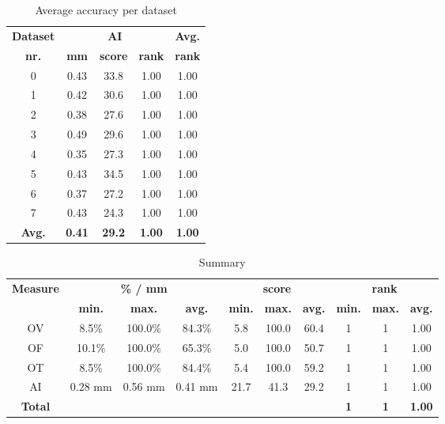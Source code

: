 \begin{table*}
\scriptsize
\caption{Average accuracy per dataset}
\centering
\begin{tabular}{|c|ccc|c|}
\hline
\multicolumn{1}{|c|}{\textbf{Dataset}} &\multicolumn{3}{c|}{\textbf{AI}} &\multicolumn{1}{c|}{\textbf{Avg.}} \\
\multicolumn{1}{|c|}{\textbf{nr.}} &\multicolumn{1}{c|}{\textbf{mm}} &\multicolumn{1}{c|}{\textbf{score}} &\multicolumn{1}{c|}{\textbf{rank}} &\multicolumn{1}{c|}{\textbf{rank}}\\
\hline
0&0.43&33.8& 1.00& 1.00\\
1&0.42&30.6& 1.00& 1.00\\
2&0.38&27.6& 1.00& 1.00\\
3&0.49&29.6& 1.00& 1.00\\
4&0.35&27.3& 1.00& 1.00\\
5&0.43&34.5& 1.00& 1.00\\
6&0.37&27.2& 1.00& 1.00\\
7&0.43&24.3& 1.00& 1.00\\
\hline
\textbf{Avg.}&\textbf{0.41}&\textbf{29.2}&\textbf{ 1.00}&\textbf{ 1.00}\\
\hline
\end{tabular}
\vspace{-0.3cm}
\label{tb:tb_4_2}
\normalsize
\end{table*}

\begin{table*}
\scriptsize
\caption{Summary}
\centering
\begin{tabular}{|c|ccc|ccc|ccc|}
\hline
\multicolumn{1}{|c|}{\textbf{Measure}} &\multicolumn{3}{c|}{\textbf{\% / mm}} &\multicolumn{3}{c|}{\textbf{score}} &\multicolumn{3}{c|}{\textbf{rank}} \\
\multicolumn{1}{|c|}{\textbf{}} &\multicolumn{1}{c|}{\textbf{min.}} &\multicolumn{1}{c|}{\textbf{max.}} &\multicolumn{1}{c|}{\textbf{avg.}} &\multicolumn{1}{c|}{\textbf{min.}} &\multicolumn{1}{c|}{\textbf{max.}} &\multicolumn{1}{c|}{\textbf{avg.}} &\multicolumn{1}{c|}{\textbf{min.}} &\multicolumn{1}{c|}{\textbf{max.}} &\multicolumn{1}{c|}{\textbf{avg.}}\\
\hline
OV& 8.5\%&100.0\%&84.3\%& 5.8&100.0&60.4&1&1& 1.00\\
OF&10.1\%&100.0\%&65.3\%& 5.0&100.0&50.7&1&1& 1.00\\
OT& 8.5\%&100.0\%&84.4\%& 5.4&100.0&59.2&1&1& 1.00\\
AI&0.28 mm&0.56 mm&0.41 mm&21.7&41.3&29.2&1&1& 1.00\\
\hline
\textbf{Total}&\textbf{}&\textbf{}&\textbf{}&\textbf{}&\textbf{}&\textbf{}&\textbf{1}&\textbf{1}&\textbf{ 1.00}\\
\hline
\end{tabular}
\vspace{-0.3cm}
\label{tb:tb_4_3}
\normalsize
\end{table*}



